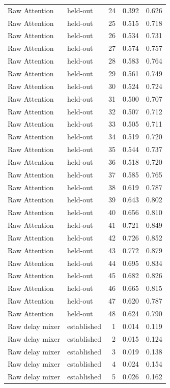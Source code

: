 \begin{tabular}{llrrr}
Raw Attention & held-out & 24 & 0.392 & 0.626 \\
Raw Attention & held-out & 25 & 0.515 & 0.718 \\
Raw Attention & held-out & 26 & 0.534 & 0.731 \\
Raw Attention & held-out & 27 & 0.574 & 0.757 \\
Raw Attention & held-out & 28 & 0.583 & 0.764 \\
Raw Attention & held-out & 29 & 0.561 & 0.749 \\
Raw Attention & held-out & 30 & 0.524 & 0.724 \\
Raw Attention & held-out & 31 & 0.500 & 0.707 \\
Raw Attention & held-out & 32 & 0.507 & 0.712 \\
Raw Attention & held-out & 33 & 0.505 & 0.711 \\
Raw Attention & held-out & 34 & 0.519 & 0.720 \\
Raw Attention & held-out & 35 & 0.544 & 0.737 \\
Raw Attention & held-out & 36 & 0.518 & 0.720 \\
Raw Attention & held-out & 37 & 0.585 & 0.765 \\
Raw Attention & held-out & 38 & 0.619 & 0.787 \\
Raw Attention & held-out & 39 & 0.643 & 0.802 \\
Raw Attention & held-out & 40 & 0.656 & 0.810 \\
Raw Attention & held-out & 41 & 0.721 & 0.849 \\
Raw Attention & held-out & 42 & 0.726 & 0.852 \\
Raw Attention & held-out & 43 & 0.772 & 0.879 \\
Raw Attention & held-out & 44 & 0.695 & 0.834 \\
Raw Attention & held-out & 45 & 0.682 & 0.826 \\
Raw Attention & held-out & 46 & 0.665 & 0.815 \\
Raw Attention & held-out & 47 & 0.620 & 0.787 \\
Raw Attention & held-out & 48 & 0.624 & 0.790 \\
Raw delay mixer & established & 1 & 0.014 & 0.119 \\
Raw delay mixer & established & 2 & 0.015 & 0.124 \\
Raw delay mixer & established & 3 & 0.019 & 0.138 \\
Raw delay mixer & established & 4 & 0.024 & 0.154 \\
Raw delay mixer & established & 5 & 0.026 & 0.162 \\

\end{tabular}
